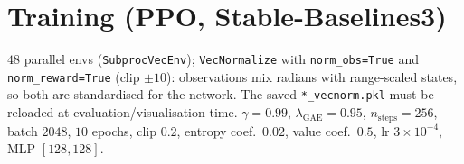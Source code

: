 \documentclass[11pt, a4paper]{article}
\begin{document}
\section{Training (PPO, Stable-Baselines3)}
$48$ parallel envs (\texttt{SubprocVecEnv}); \texttt{VecNormalize} with
\texttt{norm\_obs=True} and \texttt{norm\_reward=True} (clip $\pm10$): observations mix
radians with range-scaled states, so both are standardised for the network.
The saved \texttt{*\_vecnorm.pkl} must be reloaded at evaluation/visualisation time.
$\gamma=0.99$, $\lambda_\text{GAE}=0.95$, $n_\text{steps}=256$, batch $2048$, $10$ epochs,
clip $0.2$, entropy coef.\ $0.02$, value coef.\ $0.5$, lr $3\times10^{-4}$, MLP $[128,128]$.
\end{document}
